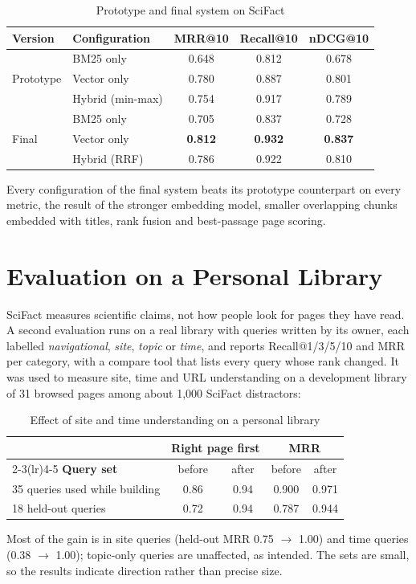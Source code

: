 \begin{table}[H]
\centering
\small
\begin{tabular}{llccc}
\toprule
\textbf{Version} & \textbf{Configuration} & \textbf{MRR@10} & \textbf{Recall@10} & \textbf{nDCG@10} \\
\midrule
\multirow{3}{*}{Prototype}
 & BM25 only & 0.648 & 0.812 & 0.678 \\
 & Vector only & 0.780 & 0.887 & 0.801 \\
 & Hybrid (min-max) & 0.754 & 0.917 & 0.789 \\
\midrule
\multirow{3}{*}{Final}
 & BM25 only & 0.705 & 0.837 & 0.728 \\
 & Vector only & \textbf{0.812} & \textbf{0.932} & \textbf{0.837} \\
 & Hybrid (RRF) & 0.786 & 0.922 & 0.810 \\
\bottomrule
\end{tabular}
\caption{Prototype and final system on SciFact}
\label{tab:proto-compare}
\end{table}

Every configuration of the final system beats its prototype counterpart on
every metric, the result of the stronger embedding model, smaller
overlapping chunks embedded with titles, rank fusion and best-passage page
scoring.

\section{Evaluation on a Personal Library}

SciFact measures scientific claims, not how people look for pages they have
read. A second evaluation runs on a real library with queries written by its
owner, each labelled \emph{navigational}, \emph{site}, \emph{topic} or
\emph{time}, and reports Recall@1/3/5/10 and MRR per category, with a
compare tool that lists every query whose rank changed. It was used to
measure site, time and URL understanding on a development library of 31
browsed pages among about 1{,}000 SciFact distractors:

\begin{table}[H]
\centering
\small
\begin{tabular}{lcccc}
\toprule
& \multicolumn{2}{c}{\textbf{Right page first}} & \multicolumn{2}{c}{\textbf{MRR}} \\
\cmidrule(lr){2-3}\cmidrule(lr){4-5}
\textbf{Query set} & before & after & before & after \\
\midrule
35 queries used while building & 0.86 & 0.94 & 0.900 & 0.971 \\
18 held-out queries & 0.72 & 0.94 & 0.787 & 0.944 \\
\bottomrule
\end{tabular}
\caption{Effect of site and time understanding on a personal library}
\label{tab:personal}
\end{table}

Most of the gain is in site queries (held-out MRR 0.75 $\rightarrow$ 1.00)
and time queries (0.38 $\rightarrow$ 1.00); topic-only queries are
unaffected, as intended. The sets are small, so the results indicate
direction rather than precise size.
